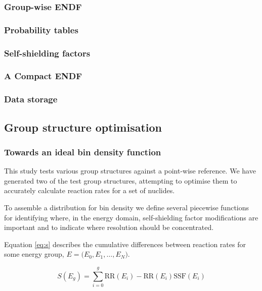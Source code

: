 \subsubsection{Group-wise ENDF}

\subsubsection{Probability tables}

\subsubsection{Self-shielding factors}

\subsubsection{A Compact ENDF}

\subsubsection{Data storage }

\subsection{Group structure optimisation}
\label{subsec:opt}

\subsubsection{Towards an ideal bin density function}
This study tests various group structures against a point-wise reference. We have generated two of the test group structures, attempting to optimise them to accurately calculate reaction rates for a set of nuclides.

To assemble a distribution for bin density we define several piecewise functions for identifying where, in the energy domain, self-shielding factor modifications are important and to indicate where resolution should be concentrated. 

Equation \ref{eq:s} describes the cumulative differences between reaction rates for some energy group, ${E = (E_{0}, E_{1}, \dots, E_{N}})$. 

\begin{equation}
\label{eq:s}
S(E_{g}) = \sum_{i=0}^{g} \mathrm{RR}(E_{i}) - \mathrm{RR}(E_{i})\mathrm{SSF}(E_{i})
\end{equation}


